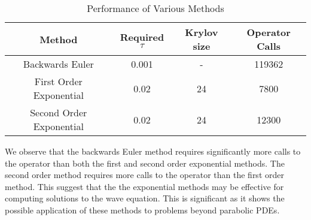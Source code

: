 \begin{table}[H]
    \centering
    \begin{tabular}{| c | c | c | c |}
    \hline
    Method & Required $\tau$ & Krylov size & Operator Calls\\
    \hline
    Backwards Euler & 0.001 & - & 119362 \\
    First Order Exponential & 0.02 & 24 & 7800 \\
    Second Order Exponential & 0.02 & 24 & 12300 \\
    \hline
    \end{tabular}
    \caption{Performance of Various Methods}
    \label{tab:reduced_data}
\end{table}

We observe that the backwards Euler method requires significantly more calls to the operator than both the first and second order exponential methods.
The second order method requires more calls to the operator than the first order method.
This suggest that the the exponential methods may be effective for computing solutions to the wave equation.
This is significant as it shows the possible application of these methods to problems beyond parabolic PDEs.